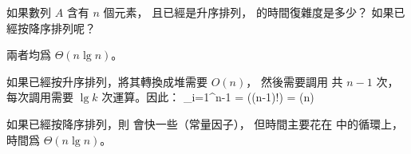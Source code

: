 如果數列 $A$ 含有 $n$ 個元素，
且已經是升序排列，  的時間復雜度是多少？
如果已經按降序排列呢？
\stopEXERCISE

\startANSWER
兩者均爲 $\Theta(n\lg{n})$。

如果已經按升序排列，將其轉換成堆需要 $O(n)$，
然後需要調用  共 $n-1$ 次，
每次調用需要 $\lg{k}$ 次運算。因此：
\startformula
\sum_{i=1}^{n-1} = \lg((n-1)!) = \Theta(n)
\stopformula

如果已經按降序排列，則  會快一些（常量因子），
但時間主要花在  中的循環上，時間爲 $\Theta(n\lg{n})$。
\stopANSWER
